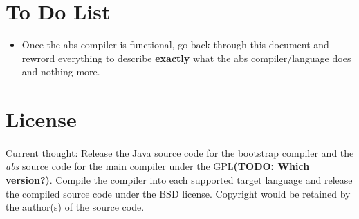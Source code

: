 \documentclass[hidelinks]{article}
\begin{document}
\section{To Do List}
\begin{itemize}
\item Once the abs compiler is functional, go back through this document and rewrord everything to describe \textbf{exactly} what the abs compiler/language does and nothing more.
\end{itemize}\newpage
\section{License}
\paragraph{} Current thought: Release the Java source code for the bootstrap compiler and the \textit{abs} source code for the main compiler under the GPL\textbf{(TODO: Which version?)}. Compile the compiler into each supported target language and release the compiled source code under the BSD license. Copyright would be retained by the author(s) of the source code.
\newline\newline\noindent
\end{document}
